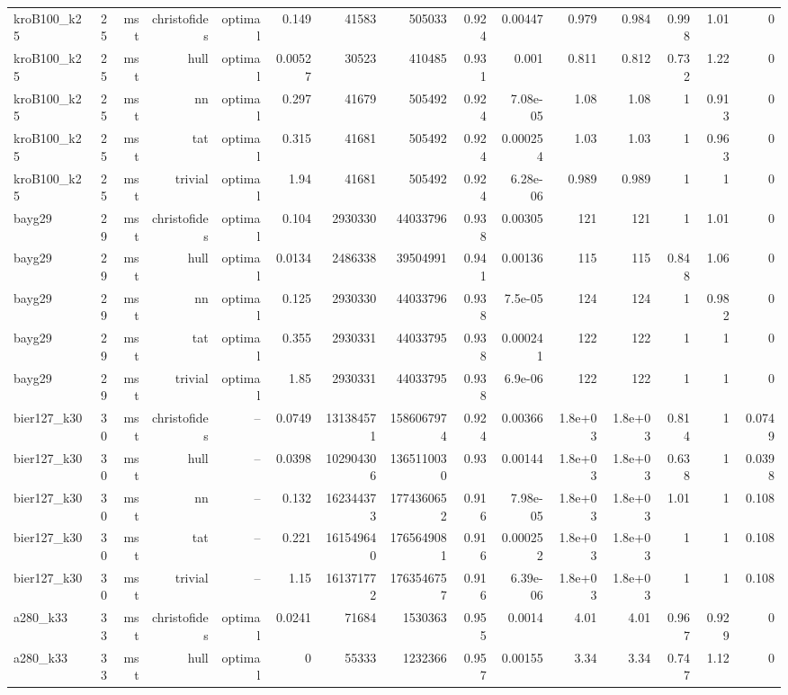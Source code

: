 \begin{tabular}{lrrrrrrrrrrrrrr}
kroB100\_k25 & 25 & mst & christofides & optimal & 0.149 & 41583 & 505033 & 0.924 & 0.00447 & 0.979 & 0.984 & 0.998 & 1.01 & 0 \\
kroB100\_k25 & 25 & mst & hull & optimal & 0.00527 & 30523 & 410485 & 0.931 & 0.001 & 0.811 & 0.812 & 0.732 & 1.22 & 0 \\
kroB100\_k25 & 25 & mst & nn & optimal & 0.297 & 41679 & 505492 & 0.924 & 7.08e-05 & 1.08 & 1.08 & 1 & 0.913 & 0 \\
kroB100\_k25 & 25 & mst & tat & optimal & 0.315 & 41681 & 505492 & 0.924 & 0.000254 & 1.03 & 1.03 & 1 & 0.963 & 0 \\
kroB100\_k25 & 25 & mst & trivial & optimal & 1.94 & 41681 & 505492 & 0.924 & 6.28e-06 & 0.989 & 0.989 & 1 & 1 & 0 \\
bayg29 & 29 & mst & christofides & optimal & 0.104 & 2930330 & 44033796 & 0.938 & 0.00305 & 121 & 121 & 1 & 1.01 & 0 \\
bayg29 & 29 & mst & hull & optimal & 0.0134 & 2486338 & 39504991 & 0.941 & 0.00136 & 115 & 115 & 0.848 & 1.06 & 0 \\
bayg29 & 29 & mst & nn & optimal & 0.125 & 2930330 & 44033796 & 0.938 & 7.5e-05 & 124 & 124 & 1 & 0.982 & 0 \\
bayg29 & 29 & mst & tat & optimal & 0.355 & 2930331 & 44033795 & 0.938 & 0.000241 & 122 & 122 & 1 & 1 & 0 \\
bayg29 & 29 & mst & trivial & optimal & 1.85 & 2930331 & 44033795 & 0.938 & 6.9e-06 & 122 & 122 & 1 & 1 & 0 \\
bier127\_k30 & 30 & mst & christofides & -- & 0.0749 & 131384571 & 1586067974 & 0.924 & 0.00366 & 1.8e+03 & 1.8e+03 & 0.814 & 1 & 0.0749 \\
bier127\_k30 & 30 & mst & hull & -- & 0.0398 & 102904306 & 1365110030 & 0.93 & 0.00144 & 1.8e+03 & 1.8e+03 & 0.638 & 1 & 0.0398 \\
bier127\_k30 & 30 & mst & nn & -- & 0.132 & 162344373 & 1774360652 & 0.916 & 7.98e-05 & 1.8e+03 & 1.8e+03 & 1.01 & 1 & 0.108 \\
bier127\_k30 & 30 & mst & tat & -- & 0.221 & 161549640 & 1765649081 & 0.916 & 0.000252 & 1.8e+03 & 1.8e+03 & 1 & 1 & 0.108 \\
bier127\_k30 & 30 & mst & trivial & -- & 1.15 & 161371772 & 1763546757 & 0.916 & 6.39e-06 & 1.8e+03 & 1.8e+03 & 1 & 1 & 0.108 \\
a280\_k33 & 33 & mst & christofides & optimal & 0.0241 & 71684 & 1530363 & 0.955 & 0.0014 & 4.01 & 4.01 & 0.967 & 0.929 & 0 \\
a280\_k33 & 33 & mst & hull & optimal & 0 & 55333 & 1232366 & 0.957 & 0.00155 & 3.34 & 3.34 & 0.747 & 1.12 & 0 \\

\end{tabular}
